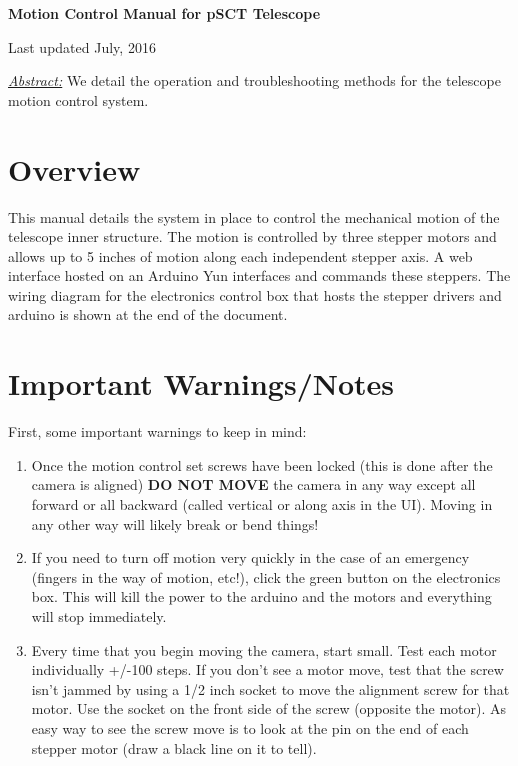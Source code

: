 \documentclass[11pt]{article}
\begin{document}
\begin{center}
{\bf{\huge{Motion Control Manual for pSCT Telescope}}}

\vspace{0.1in}
Last updated July, 2016

\vspace{0.3in}
{\it{\underline{Abstract:}}} We detail the operation and troubleshooting methods for the telescope motion control system.

\end{center}

\tableofcontents

\vspace{0.2in}


\section{Overview}

This manual details the system in place to control the mechanical motion of the telescope inner structure.
The motion is controlled by three stepper motors and allows up to 5 inches of motion along each independent stepper axis. 
A web interface hosted on an Arduino Yun interfaces and commands these steppers.
The wiring diagram for the electronics control box that hosts the stepper drivers and arduino is shown at the end of the document.


\section{Important Warnings/Notes}

First, some important warnings to keep in mind:
\begin{enumerate}
	\item Once the motion control set screws have been locked (this is done after the camera is aligned) {\bf DO NOT MOVE} the camera in any way except all forward or all backward (called vertical or along axis in the UI).
	Moving in any other way will likely break or bend things!
	\item If you need to turn off motion very quickly in the case of an emergency (fingers in the way of motion, etc!), click the green button on the electronics box.
		 This will kill the power to the arduino and the motors and everything will stop immediately.
	\item Every time that you begin moving the camera, start small.  Test each motor individually +/-100 steps.  
		If you don't see a motor move, test that the screw isn't jammed by using a 1/2 inch socket to move the alignment screw for that motor.
		Use the socket on the front side of the screw (opposite the motor).
		As easy way to see the screw move is to look at the pin on the end of each stepper motor (draw a black line on it to tell).
\end{enumerate}
\end{document}
